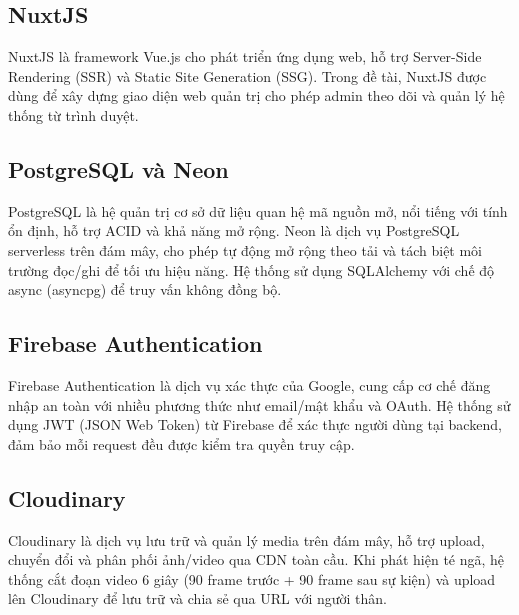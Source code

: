 \subsection{NuxtJS}

NuxtJS là framework Vue.js cho phát triển ứng dụng web, hỗ trợ Server-Side Rendering (SSR) và Static Site Generation (SSG). Trong đề tài, NuxtJS được dùng để xây dựng giao diện web quản trị cho phép admin theo dõi và quản lý hệ thống từ trình duyệt.

\subsection{PostgreSQL và Neon}

PostgreSQL là hệ quản trị cơ sở dữ liệu quan hệ mã nguồn mở, nổi tiếng với tính ổn định, hỗ trợ ACID và khả năng mở rộng. Neon là dịch vụ PostgreSQL serverless trên đám mây, cho phép tự động mở rộng theo tải và tách biệt môi trường đọc/ghi để tối ưu hiệu năng. Hệ thống sử dụng SQLAlchemy với chế độ async (asyncpg) để truy vấn không đồng bộ.

\subsection{Firebase Authentication}

Firebase Authentication là dịch vụ xác thực của Google, cung cấp cơ chế đăng nhập an toàn với nhiều phương thức như email/mật khẩu và OAuth. Hệ thống sử dụng JWT (JSON Web Token) từ Firebase để xác thực người dùng tại backend, đảm bảo mỗi request đều được kiểm tra quyền truy cập.

\subsection{Cloudinary}

Cloudinary là dịch vụ lưu trữ và quản lý media trên đám mây, hỗ trợ upload, chuyển đổi và phân phối ảnh/video qua CDN toàn cầu. Khi phát hiện té ngã, hệ thống cắt đoạn video 6 giây (90 frame trước + 90 frame sau sự kiện) và upload lên Cloudinary để lưu trữ và chia sẻ qua URL với người thân.


